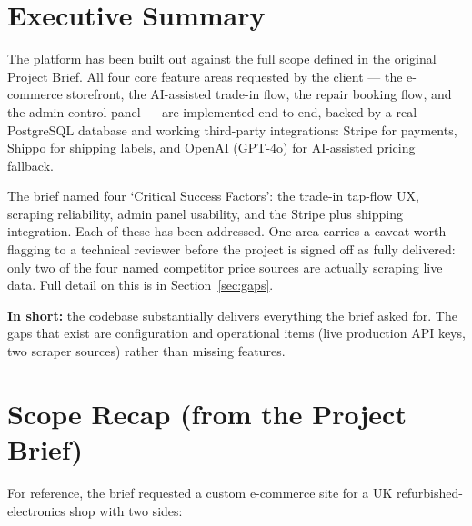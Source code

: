 \documentclass[11pt,a4paper]{article}
\begin{document}
\section{Executive Summary}

The platform has been built out against the full scope defined in the original Project Brief. All four core feature areas requested by the client --- the e-commerce storefront, the AI-assisted trade-in flow, the repair booking flow, and the admin control panel --- are implemented end to end, backed by a real PostgreSQL database and working third-party integrations: Stripe for payments, Shippo for shipping labels, and OpenAI (GPT-4o) for AI-assisted pricing fallback.

The brief named four `Critical Success Factors': the trade-in tap-flow UX, scraping reliability, admin panel usability, and the Stripe plus shipping integration. Each of these has been addressed. One area carries a caveat worth flagging to a technical reviewer before the project is signed off as fully delivered: only two of the four named competitor price sources are actually scraping live data. Full detail on this is in Section~\ref{sec:gaps}.

\begin{tcolorbox}[colback=AccentLight, colframe=Accent, boxrule=0.5pt, arc=1.5mm, left=10pt, right=10pt, top=8pt, bottom=8pt]
\textbf{In short:} the codebase substantially delivers everything the brief asked for. The gaps that exist are configuration and operational items (live production API keys, two scraper sources) rather than missing features.
\end{tcolorbox}

\section{Scope Recap (from the Project Brief)}

For reference, the brief requested a custom e-commerce site for a UK refurbished-electronics shop with two sides:
\end{document}
